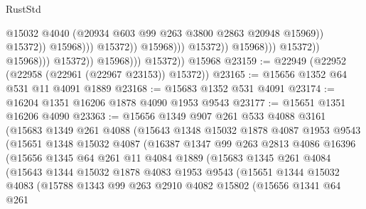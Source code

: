 \begin{lexlean}{RustStd}
\begin{coremodule}
                                                            @15032
                                                            @4040
                                                            (@20934
                                                              @603
                                                              @99
                                                              @263
                                                              @3800
                                                              @2863
                                                              @20948
                                                              @15969))
                                                          @15372))
                                                      @15968)))
                                                @15372))
                                            @15968)))
                                      @15372))
                                  @15968)))
                            @15372))
                        @15968)))
                  @15372))
              @15968)))
        @15372))
    @15968
@23159 := @22949 (@22952 (@22958 (@22961 (@22967 @23153)) @15372))
@23165 := @15656 @1352 @64 @531 @11 @4091 @1889
@23168 := @15683 @1352 @531 @4091
@23174 := @16204 @1351 @16206 @1878 @4090 @1953 @9543
@23177 := @15651 @1351 @16206 @4090
@23363 := @15656
    @1349
    @907
    @261
    @533
    @4088
    @3161
    (@15683
      @1349
      @261
      @4088
      (@15643
        @1348
        @15032
        @1878
        @4087
        @1953
        @9543
        (@15651
          @1348
          @15032
          @4087
          (@16387
            @1347
            @99
            @263
            @2813
            @4086
            @16396
            (@15656
              @1345
              @64
              @261
              @11
              @4084
              @1889
              (@15683
                @1345
                @261
                @4084
                (@15643
                  @1344
                  @15032
                  @1878
                  @4083
                  @1953
                  @9543
                  (@15651
                    @1344
                    @15032
                    @4083
                    (@15788
                      @1343
                      @99
                      @263
                      @2910
                      @4082
                      @15802
                      (@15656
                        @1341
                        @64
                        @261

\end{coremodule}
\end{lexlean}
